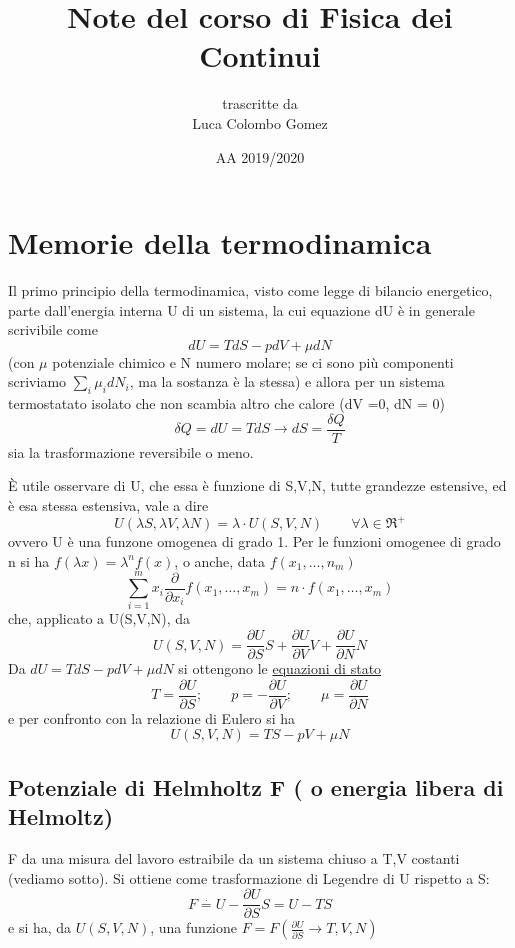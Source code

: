 \documentclass[a4paper,11pt]{report}
\title{Note del corso di Fisica dei Continui}
\author{trascritte da \\Luca Colombo Gomez}
\date{AA 2019/2020}
\newcommand{\eacc}{È }
\begin{document}
	\titlepage
	\maketitle
	\tableofcontents
	
\chapter*{Memorie della termodinamica}
		Il primo principio della termodinamica, visto come legge di bilancio energetico, parte dall'energia interna U di un sistema, la cui equazione dU è in generale scrivibile come
		$$dU = TdS - pdV + \mu dN $$
		(con $\mu$ potenziale chimico e N numero molare; se ci sono più componenti scriviamo $\sum_i \mu_i dN_i $, ma la sostanza è la stessa)
		e allora per un sistema termostatato isolato che non scambia altro che calore (dV =0, dN = 0)
		$$
		\delta Q = dU = TdS \rightarrow dS = \dfrac{\delta Q}{T}
		$$
		sia la trasformazione reversibile o meno.
		
		\eacc utile osservare di U, che essa è funzione di S,V,N, tutte grandezze estensive, ed è esa stessa estensiva, vale a dire 
		\begin{equation}
			U(\lambda S, \lambda V, \lambda N) = \lambda \cdot U(S,V,N) \qquad \forall \lambda \in \Re^+
		\end{equation}
		ovvero U è una funzone omogenea di grado 1. Per le funzioni omogenee di grado n si ha $f(\lambda x) = \lambda ^n f(x)$, o anche, data $f(x_1,\dots, n_m)$
		\begin{equation}
			\sum_{i=1}^{m}x_i \dfrac{\partial}{\partial x_i} f(x_1, \dots, x_m) = n \cdot f(x_1, \dots, x_m)
		\end{equation}
		che, applicato a U(S,V,N), da
		\begin{equation}
			U(S,V,N) = \dfrac{\partial U}{\partial S} S + \dfrac{\partial U}{\partial V} V + \dfrac{\partial U}{\partial N} N
		\end{equation}
		Da $dU = TdS -pdV + \mu dN$ si ottengono le \underline{equazioni di stato}
		\begin{equation}
			T=\dfrac{\partial U}{\partial S}; \qquad p = - \dfrac{\partial U}{\partial V}; \qquad \mu = \dfrac{\partial U}{\partial N}
		\end{equation}
		e per confronto con la relazione di Eulero si ha
		\begin{equation}
			U(S,V,N)=TS-pV+\mu N
		\end{equation}
	\section{Potenziale di Helmholtz F ( o energia libera di Helmoltz)}
			F da una misura del lavoro estraibile da un sistema chiuso a T,V costanti (vediamo sotto).
			Si ottiene come trasformazione di Legendre di U rispetto a S:
			\begin{equation}
				F \overset{\cdot}{=} U- \dfrac{\partial U}{\partial S} S = U-TS
			\end{equation}
			e si ha, da $U(S,V,N)$, una funzione $F = F(\frac{\partial U}{\partial S} \rightarrow T, V,N)$
			
\end{document}
